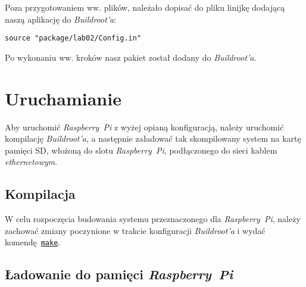 \documentclass{article}
\begin{document}
Poza przygotowaniem ww. plików, należało dopisać do pliku  linijkę dodającą naszą aplikację do \emph{Buildroot'a}:
\begin{Verbatim}[frame=single]
source "package/lab02/Config.in"
\end{Verbatim}

Po wykonaniu ww. kroków nasz pakiet  został dodany do \emph{Buildroot'a}.


\section{Uruchamianie}

Aby uruchomić \emph{Raspberry~Pi} z wyżej opianą konfiguracją, należy uruchomić kompilację \emph{Buildroot'a}, a następnie załadować tak skompilowany system na kartę pamięci SD, włożoną do slotu \emph{Raspberry~Pi}, podłączonego do sieci kablem \emph{ethernetowym}.

\subsection{Kompilacja}

W celu rozpoczęcia budowania systemu przeznaczonego dla \emph{Raspberry~Pi}, należy zachować zmiany poczynione w trakcie konfiguracji \emph{Buildroot'a} i wydać komendę~\texttt{\href{https://github.com/buildroot/buildroot/blob/master/Makefile}{make}}.


\subsection{Ładowanie do pamięci \emph{Raspberry~Pi}}
\end{document}
